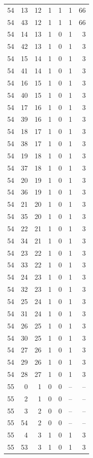 \begin{longtable}{rrrrrrr}
54 & 13 & 12 & 1 & 1 & 1 & 66\\
54 & 43 & 12 & 1 & 1 & 1 & 66\\
54 & 14 & 13 & 1 & 0 & 1 & 3\\
54 & 42 & 13 & 1 & 0 & 1 & 3\\
54 & 15 & 14 & 1 & 0 & 1 & 3\\
54 & 41 & 14 & 1 & 0 & 1 & 3\\
54 & 16 & 15 & 1 & 0 & 1 & 3\\
54 & 40 & 15 & 1 & 0 & 1 & 3\\
54 & 17 & 16 & 1 & 0 & 1 & 3\\
54 & 39 & 16 & 1 & 0 & 1 & 3\\
54 & 18 & 17 & 1 & 0 & 1 & 3\\
54 & 38 & 17 & 1 & 0 & 1 & 3\\
54 & 19 & 18 & 1 & 0 & 1 & 3\\
54 & 37 & 18 & 1 & 0 & 1 & 3\\
54 & 20 & 19 & 1 & 0 & 1 & 3\\
54 & 36 & 19 & 1 & 0 & 1 & 3\\
54 & 21 & 20 & 1 & 0 & 1 & 3\\
54 & 35 & 20 & 1 & 0 & 1 & 3\\
54 & 22 & 21 & 1 & 0 & 1 & 3\\
54 & 34 & 21 & 1 & 0 & 1 & 3\\
54 & 23 & 22 & 1 & 0 & 1 & 3\\
54 & 33 & 22 & 1 & 0 & 1 & 3\\
54 & 24 & 23 & 1 & 0 & 1 & 3\\
54 & 32 & 23 & 1 & 0 & 1 & 3\\
54 & 25 & 24 & 1 & 0 & 1 & 3\\
54 & 31 & 24 & 1 & 0 & 1 & 3\\
54 & 26 & 25 & 1 & 0 & 1 & 3\\
54 & 30 & 25 & 1 & 0 & 1 & 3\\
54 & 27 & 26 & 1 & 0 & 1 & 3\\
54 & 29 & 26 & 1 & 0 & 1 & 3\\
54 & 28 & 27 & 1 & 0 & 1 & 3\\
55 & 0 & 1 & 0 & 0 & -- & --\\
55 & 2 & 1 & 0 & 0 & -- & --\\
55 & 3 & 2 & 0 & 0 & -- & --\\
55 & 54 & 2 & 0 & 0 & -- & --\\
55 & 4 & 3 & 1 & 0 & 1 & 3\\
55 & 53 & 3 & 1 & 0 & 1 & 3\\

\end{longtable}
